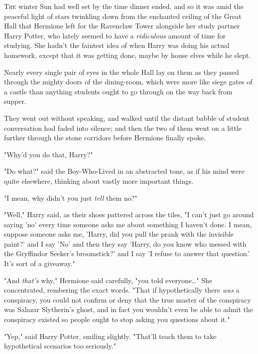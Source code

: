 
\lettrine{T}{he} winter Sun 
had well set by the time dinner ended, and so it was amid the peaceful light of 
stars twinkling down from the enchanted ceiling of the Great Hall that Hermione 
left for the Ravenclaw Tower alongside her study partner Harry Potter, who 
lately seemed to have a \emph{ridiculous} amount of time for studying. She 
hadn't the faintest idea of when Harry was doing his actual homework, except 
that it was getting done, maybe by house elves while he slept.

Nearly every single pair of eyes in the whole Hall lay on them as they passed 
through the mighty doors of the dining-room, which were more like siege gates 
of a castle than anything students ought to go through on the way back from 
supper.

They went out without speaking, and walked until the distant babble of student 
conversation had faded into silence; and then the two of them went on a little 
further through the stone corridors before Hermione finally spoke.

"Why'd you do that, Harry?"

"Do what?" said the Boy-Who-Lived in an abstracted tone, as if his mind were 
quite elsewhere, thinking about vastly more important things.

"I mean, why didn't you just \emph{tell} them no?"

"Well," Harry said, as their shoes pattered across the tiles, "I can't just go 
around saying 'no' every time someone asks me about something I haven't done. I 
mean, suppose someone asks me, 'Harry, did you pull the prank with the 
invisible paint?' and I say 'No' and then they say 'Harry, do you know who 
messed with the Gryffindor Seeker's broomstick?' and I say 'I refuse to answer 
that question.' It's sort of a giveaway."

"And \emph{that's} why," Hermione said carefully, "you told everyone{\ldots}" 
She concentrated, rembering the exact words. "That if hypothetically there 
\emph{was} a conspiracy, you could not confirm or deny that the true master of 
the conspiracy was Salazar Slytherin's ghost, and in fact you wouldn't even be 
able to admit the conspiracy existed so people ought to stop asking you 
questions about it."

"Yep," said Harry Potter, smiling slightly. "That'll teach them to take 
hypothetical scenarios too seriously."

